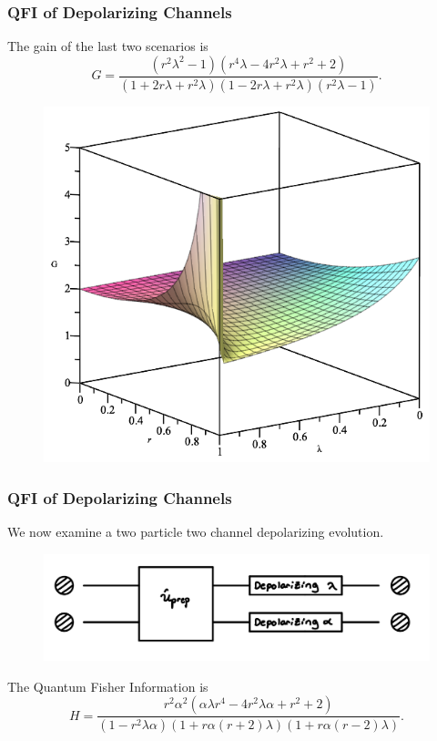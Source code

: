 \documentclass{beamer}
\begin{document}
\begin{frame}
\frametitle{QFI of Depolarizing Channels}
The gain of the last two scenarios is
\begin{equation}\label{eq:48}
G=\frac{(r^2\lambda^2-1)(r^4\lambda-4r^2\lambda+r^2+2)}{(1+2r\lambda+r^2\lambda)(1-2r\lambda+r^2\lambda)(r^2\lambda-1)}.
\end{equation}
\begin{figure}
\begin{center}
\includegraphics[width=0.60\linewidth]{Depolarizing-Double-Channel-Lambda-Gain-Graph.png}
\end{center}
\end{figure}
\end{frame}
\begin{frame}
\frametitle{QFI of Depolarizing Channels}
We now examine a two particle two channel depolarizing evolution.
\begin{figure}
\begin{center}
\includegraphics[width=0.75\linewidth]{Depolarizing-Double-Channel-Alpha-and-Lambda-Schematic.jpg}
\end{center}
\end{figure}
The Quantum Fisher Information is
\begin{equation}\label{eq:49}
H=\frac{r^2\alpha^2(\alpha\lambda r^4-4r^2\lambda\alpha+r^2+2)}{(1-r^2\lambda\alpha)(1+r\alpha(r+2)\lambda)(1+r\alpha(r-2)\lambda)}.
\end{equation}
\end{frame}
\end{document}
